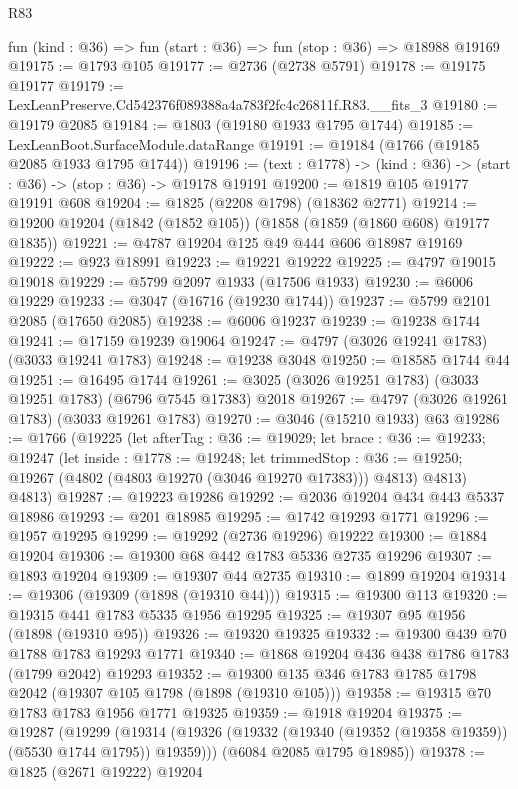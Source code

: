 \begin{lexlean}{R83}
\begin{coremodule}
  fun (kind : @36) => fun (start : @36) => fun (stop : @36) => @18988 @19169
@19175 := @1793 @105
@19177 := @2736 (@2738 @5791)
@19178 := @19175 @19177
@19179 := LexLeanPreserve.Cd542376f089388a4a783f2fc4c26811f.R83.__fits_3
@19180 := @19179 @2085
@19184 := @1803 (@19180 @1933 @1795 @1744)
@19185 := LexLeanBoot.SurfaceModule.dataRange
@19191 := @19184 (@1766 (@19185 @2085 @1933 @1795 @1744))
@19196 := (text : @1778) -> (kind : @36) -> (start : @36) -> (stop : @36) -> @19178 @19191
@19200 := @1819 @105 @19177 @19191 @608
@19204 := @1825 (@2208 @1798) (@18362 @2771)
@19214 := @19200 @19204 (@1842 (@1852 @105)) (@1858 (@1859 (@1860 @608) @19177 @1835))
@19221 := @4787 @19204 @125 @49 @444 @606 @18987 @19169
@19222 := @923 @18991
@19223 := @19221 @19222
@19225 := @4797 @19015 @19018
@19229 := @5799 @2097 @1933 (@17506 @1933)
@19230 := @6006 @19229
@19233 := @3047 (@16716 (@19230 @1744))
@19237 := @5799 @2101 @2085 (@17650 @2085)
@19238 := @6006 @19237
@19239 := @19238 @1744
@19241 := @17159 @19239 @19064
@19247 := @4797 (@3026 @19241 @1783) (@3033 @19241 @1783)
@19248 := @19238 @3048
@19250 := @18585 @1744 @44
@19251 := @16495 @1744
@19261 := @3025 (@3026 @19251 @1783) (@3033 @19251 @1783) (@6796 @7545 @17383) @2018
@19267 := @4797 (@3026 @19261 @1783) (@3033 @19261 @1783)
@19270 := @3046 (@15210 @1933) @63
@19286 := @1766
    (@19225
      (let afterTag : @36 := @19029;
      let brace : @36 := @19233;
      @19247
        (let inside : @1778 := @19248;
        let trimmedStop : @36 := @19250; @19267 (@4802 (@4803 @19270 (@3046 @19270 @17383))) @4813)
        @4813)
      @4813)
@19287 := @19223 @19286
@19292 := @2036 @19204 @434 @443 @5337 @18986
@19293 := @201 @18985
@19295 := @1742 @19293 @1771
@19296 := @1957 @19295
@19299 := @19292 (@2736 @19296) @19222
@19300 := @1884 @19204
@19306 := @19300 @68 @442 @1783 @5336 @2735 @19296
@19307 := @1893 @19204
@19309 := @19307 @44 @2735
@19310 := @1899 @19204
@19314 := @19306 (@19309 (@1898 (@19310 @44)))
@19315 := @19300 @113
@19320 := @19315 @441 @1783 @5335 @1956 @19295
@19325 := @19307 @95 @1956 (@1898 (@19310 @95))
@19326 := @19320 @19325
@19332 := @19300 @439 @70 @1788 @1783 @19293 @1771
@19340 := @1868 @19204 @436 @438 @1786 @1783 (@1799 @2042) @19293
@19352 := @19300 @135 @346 @1783 @1785 @1798 @2042 (@19307 @105 @1798 (@1898 (@19310 @105)))
@19358 := @19315 @70 @1783 @1783 @1956 @1771 @19325
@19359 := @1918 @19204
@19375 := @19287
    (@19299
      (@19314 (@19326 (@19332 (@19340 (@19352 (@19358 @19359)) (@5530 @1744 @1795)) @19359)))
      (@6084 @2085 @1795 @18985))
@19378 := @1825 (@2671 @19222) @19204

\end{coremodule}
\end{lexlean}
